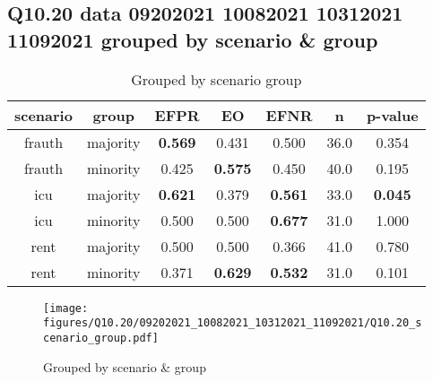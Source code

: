 \subsection{Q10.20 data 09202021 10082021 10312021 11092021 grouped by scenario \& group}

\begin{comment}
                        EFPR        EO      EFNR     n    pvalue
(frauth, majority)  0.569444  0.430556  0.500000  36.0  0.353693
(frauth, minority)  0.425000  0.575000  0.450000  40.0  0.195373
(icu, majority)     0.621212  0.378788  0.560606  33.0  0.045164
(icu, minority)     0.500000  0.500000  0.677419  31.0  1.000000
(rent, majority)    0.500000  0.500000  0.365854  41.0  0.779668
(rent, minority)    0.370968  0.629032  0.532258  31.0  0.101283
\end{comment}

\begin{table}[h]
    \centering
    \begin{tabular}{|c|c|c|c|c|c|c|}
        \hline
        scenario & group & EFPR & EO & EFNR & n & p-value\\
        \hline
        frauth & majority & \textbf{0.569} & 0.431 & 0.500 & 36.0 & 0.354\\
		frauth & minority & 0.425 & \textbf{0.575} & 0.450 & 40.0 & 0.195\\
		icu & majority & \textbf{0.621} & 0.379 & \textbf{0.561} & 33.0 & \textbf{0.045}\\
		icu & minority & 0.500 & 0.500 & \textbf{0.677} & 31.0 & 1.000\\
		rent & majority & 0.500 & 0.500 & 0.366 & 41.0 & 0.780\\
		rent & minority & 0.371 & \textbf{0.629} & \textbf{0.532} & 31.0 & 0.101\\
		
        \hline
    \end{tabular}
    \caption{Grouped by scenario group}
    \label{tab:my_label}
\end{table}
\begin{figure}[h]
    \centering
    \texttt{[image: figures/Q10.20/09202021\_10082021\_10312021\_11092021/Q10.20\_scenario\_group.pdf]}
    \caption{Grouped by scenario \& group}
    \label{fig:my_label}
\end{figure}
